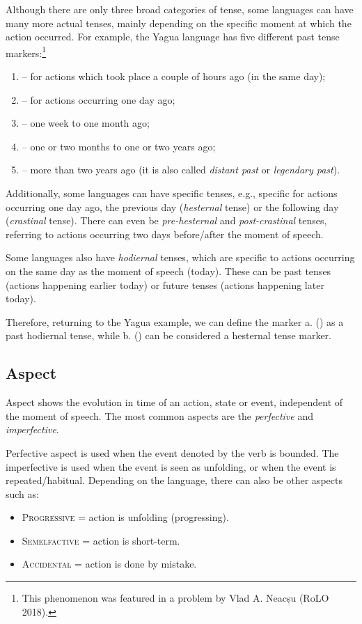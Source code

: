 \begin{refsection}
Although there are only three broad categories of tense, some languages can have many more actual tenses, mainly depending on the specific moment at which the action occurred. For example, the Yagua language has five different past tense markers:\footnote{This phenomenon was featured in a problem by Vlad A. Neacșu (RoLO 2018).}

\begin{enumerate}[label = \alph*.]
    \item {} -- for actions which took place a couple of hours ago (in the same day);
    \item {} -- for actions occurring one day ago;
    \item {} -- one week to one month ago;
    \item {} -- one or two months to one or two years ago; 
    \item {} -- more than two years ago (it is also called \textit{distant past} or \textit{legendary past}).  
\end{enumerate}

 Additionally, some languages can have specific tenses, e.g., specific for actions occurring one day ago, the previous day (\textit{hesternal} tense) or the following day (\textit{crastinal} tense). There can even be \textit{pre-hesternal} and \textit{post-crastinal} tenses, referring to actions occurring two days before/after the moment of speech.

Some languages also have \textit{hodiernal} tenses, which are specific to actions occurring on the same day as the moment of speech (today). These can be past tenses (actions happening earlier today) or future tenses (actions happening later today).

Therefore, returning to the Yagua example, we can define the marker a. () as a past hodiernal tense, while b. () can be considered a hesternal tense marker.

\subsection{Aspect}

 Aspect shows the evolution in time of an action, state or event, independent of the moment of speech. The most common aspects are the \textit{perfective} and \textit{imperfective}.

Perfective aspect is used when the event denoted by the verb is bounded. The imperfective is used when the event is seen as unfolding, or when the event is repeated/habitual. Depending on the language, there can also be other aspects such as:
\begin{itemize}
    \item \textsc{Progressive} = action is unfolding (progressing).
    \item \textsc{Semelfactive} = action is short-term.
    \item \textsc{Accidental} = action is done by mistake.
\end{itemize}


\end{refsection}
